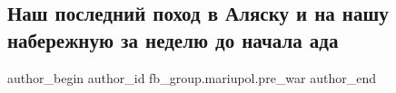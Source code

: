  
 
 
 
 

\subsection{Наш последний поход в Аляску и на нашу набережную за неделю до начала ада}
\label{sec:13_02_2023.fb.fb_group.mariupol.pre_war.9.nash_poslednii_pokho}

\ifcmt
 author_begin
   author_id fb_group.mariupol.pre_war
 author_end
\fi
